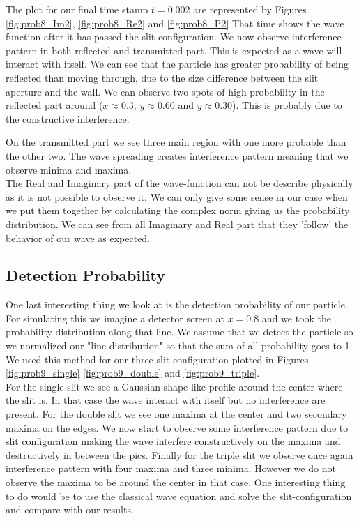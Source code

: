 \documentclass[english,notitlepage,reprint,nofootinbib]{revtex4-2}  %
\begin{document}
		
	The plot for our final time stamp $t=0.002$ are represented by 
	Figures \ref{fig:prob8_Im2}, \ref{fig:prob8_Re2} and \ref{fig:prob8_P2}
	That time shows the wave function after it has passed the slit configuration. 
	We now observe interference pattern in both reflected and transmitted part. This 
	is expected as a wave will interact with itself. We can see that the particle has
	greater probability of being reflected than moving through, due to the size difference
	between the slit aperture and the wall. We can observe two spots of high probability in 
	the reflected part around ($x\approx0.3$, $y\approx0.60$ and $y\approx0.30$). This is 
	probably due to the constructive interference. 
	
	On the transmitted part we see three main region with one more probable than the other 
	two. The wave spreading creates interference pattern meaning that we observe minima and 
	maxima. \\
	
	The Real and Imaginary part of the wave-function can not be describe physically as it 
	is not possible to observe it. We can only give some sense in our case when we put them
	together by calculating the complex norm giving us the probability distribution. We can 
	see from all Imaginary and Real part that they 'follow' the behavior of our wave as 
	expected. 
	
	
	\subsection{Detection Probability} \label{subsec:detec_prob}
	
	One last interesting thing we look at is the detection probability of our particle. 
	For simulating this we imagine a detector screen at $x=0.8$ and we took the probability
	distribution along that line. We assume that we detect the particle so we normalized 
	our "line-distribution" so that the sum of all probability goes to 1. We used this method
	for our three slit configuration plotted in Figures \ref{fig:prob9_single} \ref{fig:prob9_double}
	and \ref{fig:prob9_triple}. \\
	
	For the single slit we see a Gaussian shape-like profile around the center where the slit
	is. In that case the wave interact with itself but no interference are present.	For the
	double slit we see one maxima at the center and two secondary maxima on the edges. We now
	start to observe some interference pattern due to slit configuration making the wave 
	interfere constructively on the maxima and destructively in between the pics. Finally for
	the triple slit we observe once again interference pattern with four maxima and three 
	minima. However we do not observe the maxima to be around the center in that case. One 
	interesting thing to do would be to use the classical wave equation and solve the 
	slit-configuration and compare with our results. 
	
\end{document}
